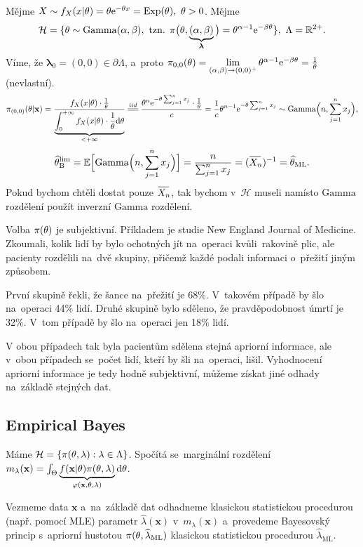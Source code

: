\begin{example}
	Mějme $X\sim f_X(x|\theta)=\theta\mathrm{e}^{-\theta x}=\mathrm{Exp}(\theta),~\theta>0$. Mějme  $$\mathcal{H}=\{\theta\sim\mathrm{Gamma}(\alpha,\beta),~\text{tzn. }\pi\big(\theta,\underbrace{(\alpha,\beta)}_{\boldsymbol{\lambda}}\big)=\theta^{\alpha-1}\mathrm{e}^{-\beta\theta}\},~\Lambda=\mathbb{R}^{2+}.$$
	Víme, že $\boldsymbol{\lambda}_0=(0,0)\in\partial\Lambda$, a~proto $\pi_{0,0}(\theta)=\lim\limits_{(\alpha,\beta)\to(0,0)^{+}}\theta^{\alpha-1}\mathrm{e}^{-\beta\theta}=\frac{1}{\theta}$ (nevlastní).
	$$\pi_{(0,0)}(\t|\textbf{x})=\frac{f_X(x|\t)\cdot\frac{1}{\t}}{\underbrace{\int_{0}^{+\infty}f_X(x|\t)\cdot\frac{1}{\t}\d\t}_{<+\infty}}\equal{iid}\frac{\t^n \e{-\t\sum_{j=1}^n x_j}\cdot\frac{1}{\t}}{c}=\frac{1}{c}\t^{n-1}\e{-\t\sum_{j=1}^n x_j}\sim\mathrm{Gamma}\Big(n,\sumjn x_j\Big),$$
	$$\htb^{\mathrm{lim}}=\E\Big[\mathrm{Gamma}\Big(n,\sumjn x_j\Big)\Big]=\frac{n}{\sum_{j=1}^n x_j}=\inv{(\Oxn)}=\html.$$
	Pokud bychom chtěli dostat pouze $\Oxn$, tak bychom v~$\mathcal{H}$ museli namísto $\mathrm{Gamma}$ rozdělení použít inverzní $\mathrm{Gamma}$ rozdělení.
\end{example}
\begin{example}
	Volba $\pi(\theta)$ je subjektivní. Příkladem je studie New England Journal of Medicine. Zkoumali, kolik lidí by bylo ochotných jít na~operaci kvůli~rakovině plic, ale pacienty rozdělili na~dvě skupiny, přičemž každé podali informaci o~přežití jiným způsobem. 
	
	První skupině řekli, že šance na~přežití je 68\%. V~takovém případě by šlo na~operaci 44\% lidí. Druhé skupině bylo sděleno, že pravděpodobnost úmrtí je 32\%. V~tom případě by šlo na~operaci jen 18\% lidí.
	
	V obou případech tak byla pacientům sdělena stejná apriorní informace, ale v~obou případech se~počet lidí, kteří by šli na~operaci, lišil. Vyhodnocení apriorní informace je tedy hodně subjektivní, můžeme získat jiné odhady na~základě stejných dat.
\end{example}

\subsection*{Empirical Bayes}
Máme $\mathcal{H}=\{\pi(\theta,\lambda):\lambda\in\Lambda\}$. Spočítá se~marginální rozdělení $m_\lambda(\textbf{x})=\int_\Theta\underbrace{f(\textbf{x}|\theta)\pi(\theta,\lambda)}_{\varphi(\textbf{x},\theta,\lambda)}\mathrm{d}\theta$. 

Vezmeme data $\textbf{x}$ a~na~základě dat odhadneme klasickou statistickou procedurou (např. pomocí MLE) parametr $\widehat{\lambda}(\textbf{x})$ v~$m_\lambda(\textbf{x})$ a~provedeme Bayesovský princip s~apriorní hustotou $\pi(\theta,\widehat{\lambda}_{\mathrm{ML}})$ klasickou statistickou procedurou $\widehat{\lambda}_{\mathrm{ML}}$.

